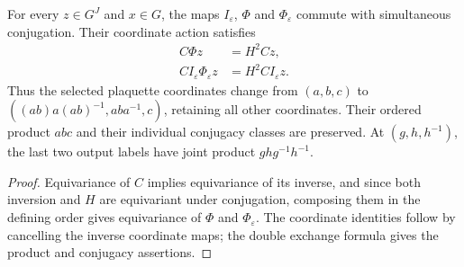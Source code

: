 \begin{lemma}%
    \label{thm:peps_regular_three_plaquette_double_exchange}
    \leanok
    For every $z\in G^J$ and $x\in G$, the maps $I_\varepsilon$,
    $\Phi$ and $\Phi_\varepsilon$ commute with simultaneous conjugation.
    Their coordinate action satisfies
    \begin{align}
        C\Phi z                          & =H^2Cz,               \\
        CI_\varepsilon\Phi_\varepsilon z & =H^2CI_\varepsilon z.
    \end{align}
    Thus the selected plaquette coordinates change from $(a,b,c)$ to
    $((ab)a(ab)^{-1},aba^{-1},c)$, retaining all other coordinates.
    Their ordered product $abc$ and their individual conjugacy classes are
    preserved. At $(g,h,h^{-1})$, the last two output labels have joint product
    $ghg^{-1}h^{-1}$.
\end{lemma}
\begin{proof}\leanok
    Equivariance of $C$ implies equivariance of its inverse, and since both
    inversion and $H$ are equivariant under conjugation, composing them in the
    defining order gives equivariance of $\Phi$ and $\Phi_\varepsilon$. The coordinate identities follow by cancelling
    the inverse coordinate maps; the double exchange formula gives the
    product and conjugacy assertions.
\end{proof}

